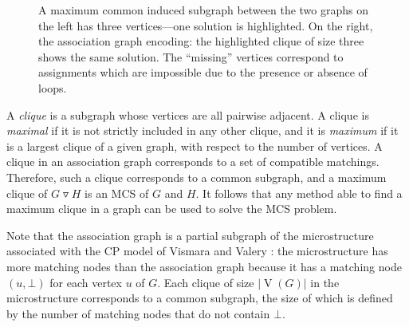 \documentclass{llncs}
\newcommand{\modularproduct}{\operatorname{\triangledown}}
\begin{document}
\begin{figure}[tb]

    \caption{A maximum common induced subgraph between the two graphs on the left has three
        vertices---one solution is highlighted. On the right, the association graph encoding: the
        highlighted clique of size three shows the same solution. The ``missing'' vertices
        correspond to assignments which are impossible due to the presence or absence of
        loops.}\label{figure:association}
\end{figure}

A \emph{clique} is a subgraph whose vertices are all pairwise adjacent. A clique is \emph{maximal}
if it is not strictly included in any other clique, and it is \emph{maximum} if it is a largest
clique of a given graph, with respect to the number of vertices.  A clique in an association graph
corresponds to a set of compatible matchings. Therefore, such a clique corresponds to a common
subgraph, and a maximum clique of $G \modularproduct H$ is an MCS of $G$ and $H$.  It follows that
any method able to find a maximum clique in a graph can be used to solve the MCS problem.

Note that the association graph is a partial subgraph of the microstructure
\cite{DBLP:conf/aaai/Jegou93a} associated with the CP model of  Vismara and Valery
\cite{DBLP:conf/mco/VismaraV08}: the microstructure has more matching nodes than the association
graph because it has a matching node $(u,\bot)$ for each vertex $u$ of $G$. Each clique of size
$\left|\operatorname{V}(G)\right|$ in the microstructure corresponds to a common subgraph, the size
of which is defined by the number of matching nodes that do not contain $\bot$.
\end{document}
